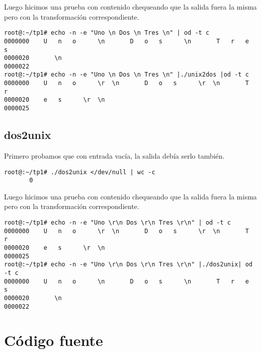 \documentclass[a4paper,11pt]{article}
\begin{document}
Luego hicimos una prueba con contenido chequeando que la salida fuera la misma pero con la transformaci\'on correspondiente.
\begin{verbatim}
root@:~/tp1# echo -n -e "Uno \n Dos \n Tres \n" | od -t c
0000000    U   n   o      \n       D   o   s      \n       T   r   e   s
0000020       \n                                                        
0000022
root@:~/tp1# echo -n -e "Uno \n Dos \n Tres \n" |./unix2dos |od -t c
0000000    U   n   o      \r  \n       D   o   s      \r  \n       T   r
0000020    e   s      \r  \n                                            
0000025
\end{verbatim}

\subsection{dos2unix}
Primero probamos que con entrada vac\'ia, la salida deb\'ia serlo tambi\'en.
\begin{verbatim}
root@:~/tp1# ./dos2unix </dev/null | wc -c
       0
\end{verbatim}

Luego hicimos una prueba con contenido chequeando que la salida fuera la misma pero con la transformaci\'on correspondiente.
\begin{verbatim}
root@:~/tp1# echo -n -e "Uno \r\n Dos \r\n Tres \r\n" | od -t c
0000000    U   n   o      \r  \n       D   o   s      \r  \n       T   r
0000020    e   s      \r  \n                                            
0000025
root@:~/tp1# echo -n -e "Uno \r\n Dos \r\n Tres \r\n" |./dos2unix| od -t c
0000000    U   n   o      \n       D   o   s      \n       T   r   e   s
0000020       \n                                                        
0000022
\end{verbatim}

\section{C\'odigo fuente}
\end{document}

